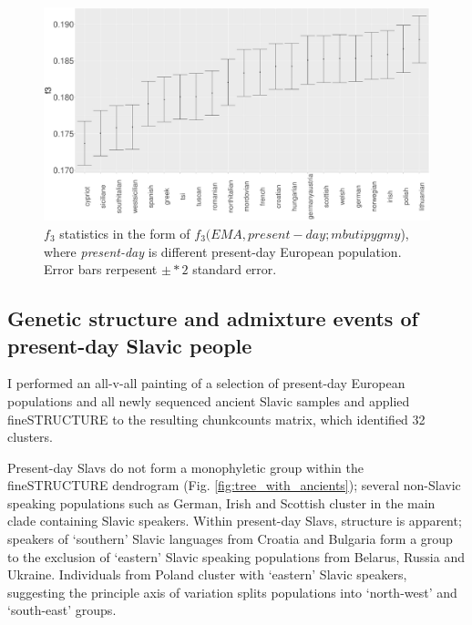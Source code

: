 \begin{figure}[htp]
    \centering
    \includegraphics[width=1.0\textwidth]{../images/chapter5/f3_HB_ancient_slavs.pdf}
    \caption{$f_{3}$ statistics in the form of $f_{3}(EMA, present-day;mbuti pygmy$), where \textit{present-day} is different present-day European population. Error bars rerpesent $\pm*2$ standard error.}
    \label{fig:f3_HB_ancient_slavs}
\end{figure}


\subsection{Genetic structure and admixture events of present-day Slavic people}

I performed an all-v-all painting of a selection of present-day European populations and all newly sequenced ancient Slavic samples and applied fineSTRUCTURE to the resulting chunkcounts matrix, which identified 32 clusters.

Present-day Slavs do not form a monophyletic group within the fineSTRUCTURE dendrogram (Fig. \ref{fig:tree_with_ancients}); several non-Slavic speaking populations such as German, Irish and Scottish cluster in the main clade containing Slavic speakers. Within present-day Slavs, structure is apparent; speakers of `southern' Slavic languages from Croatia and Bulgaria form a group to the exclusion of `eastern' Slavic speaking populations from Belarus, Russia and Ukraine. Individuals from Poland cluster with `eastern' Slavic speakers, suggesting the principle axis of variation splits populations into `north-west' and `south-east' groups. 

